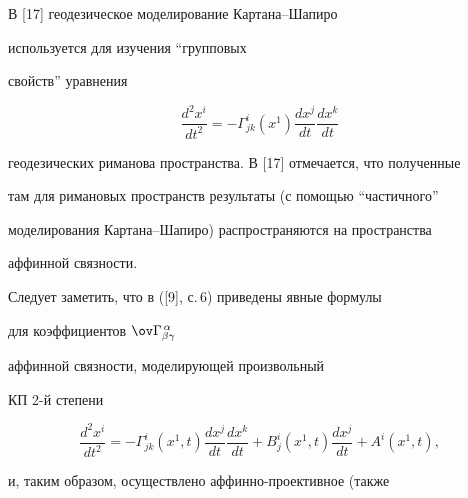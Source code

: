  


\vskip 2cm 


 






 


\label{end} 


 


 





В [17] геодезическое моделирование Картана--Шапиро 


используется для изучения ``групповых 


свойств'' уравнения 


\begin{equation} 


\frac{d^2x^i}{dt^2}=-\Gamma^i_{j k}(x^1) 


\frac{dx^j}{dt}\frac{dx^k}{dt} 


\end{equation} 


геодезических риманова пространства. В [17] отмечается, что полученные 


там для римановых пространств результаты (с помощью ``частичного'' 


моделирования Картана--Шапиро) распространяются на пространства 


аффинной связности. 


 


Следует заметить, что в ([9], с.\,6) приведены явные формулы 


для коэффициентов $\ov\Gamma^{\,\alpha}_{\beta\gamma}$ 


аффинной связности, моделирующей произвольный 


КП 2-й степени 


\begin{equation} 


\frac{d^2x^i}{dt^2}=-\Gamma^i_{j k}(x^1,t) 


\frac{dx^j}{dt}\frac{dx^k}{dt}+B^i_j(x^1,t) 


\frac{dx^j}{dt}+A^i(x^1,t), 


\end{equation} 


и, таким образом, осуществлено аффинно-проективное (также 


